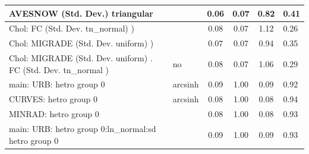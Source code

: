 \begin{table}
\begin{center}
\begin{tabular}{|l|l|c|c|c|l|}
			\hline
			AVESNOW (Std. Dev.) triangular &  & 0.06 & 0.07 & 0.82 & 0.41 \\
			\hline
			 Chol: FC (Std. Dev. tn_normal) ) &  & 0.08 & 0.07 & 1.12 & 0.26 \\
			\hline
			 Chol: MIGRADE (Std. Dev. uniform) ) &  & 0.07 & 0.07 & 0.94 & 0.35 \\
			\hline
			 Chol: MIGRADE (Std. Dev. uniform) . FC (Std. Dev.   tn_normal ) & no & 0.08 & 0.07 & 1.06 & 0.29 \\
			\hline
			main: URB: hetro group 0 & arcsinh & 0.09 & 1.00 & 0.09 & 0.92 \\
			\hline
			CURVES: hetro group 0 & arcsinh & 0.08 & 1.00 & 0.08 & 0.94 \\
			\hline
			MINRAD: hetro group 0 &  & 0.08 & 1.00 & 0.08 & 0.93 \\
			\hline
			main: URB: hetro group 0:ln_normal:sd  hetro group 0 &  & 0.09 & 1.00 & 0.09 & 0.93 \\
			\hline
		\end{tabular}
	\end{center}
\end{table}